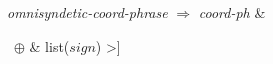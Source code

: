 \documentclass[varwidth]{standalone}
\begin{document}
\textit{omnisyndetic-coord-phrase} $\Rightarrow$ \textit{coord-ph} \& \\
\begin{avm}
[dtrs & <[conj & $\neg$nil] \, $\oplus$ & list($sign$) >]
 \end{avm}
\end{document}
